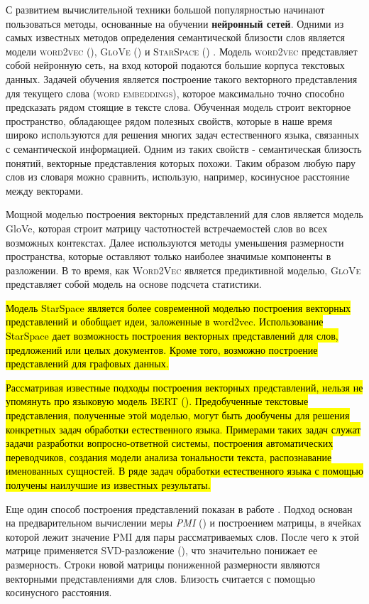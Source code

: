 С развитием вычислительной техники большой популярностью начинают пользоваться методы, основанные на обучении \textbf{нейронный сетей}. Одними из самых известных методов определения семантической близости слов является модели \textsc{word2vec} (\cite{word2vec}), \textsc{GloVe} (\cite{glove}) и \textsc{StarSpace} (\cite{starspace}) . Модель \textsc{word2vec} представляет собой нейронную сеть, на вход которой подаются большие корпуса текстовых данных. Задачей обучения является построение такого векторного представления для текущего слова (\textsc{word embeddings}), которое максимально точно способно предсказать рядом стоящие в тексте слова. Обученная модель строит векторное пространство, обладающее рядом полезных свойств, которые в наше время широко используются для решения многих задач естественного языка, связанных с семантической информацией. Одним из таких свойств - семантическая близость понятий, векторные представления которых похожи. Таким образом любую пару слов из словаря можно сравнить, использую, например, косинусное расстояние между векторами.

Мощной моделью построения векторных представлений для слов является модель GloVe, которая строит матрицу частотностей встречаемостей слов во всех возможных контекстах. Далее используются методы уменьшения размерности пространства, которые оставляют только наиболее значимые компоненты в разложении. В то время, как \textsc{Word2Vec} является предиктивной моделью, \textsc{GloVe} представляет собой модель на основе подсчета статистики.

\hl{Модель StarSpace является более современной моделью построения векторных представлений и обобщает идеи, заложенные в word2vec. Использование StarSpace дает возможность построения векторных представлений для слов, предложений или целых документов. Кроме того, возможно построение представлений для графовых данных.}

\hl{Рассматривая известные подходы построения векторных представлений, нельзя не упомянуть про языковую модель BERT (\cite{bert}). Предобученные текстовые представления, полученные этой моделью, могут быть дообучены для решения конкретных задач обработки естественного языка. Примерами таких задач служат задачи разработки вопросно-ответной системы, построения автоматических переводчиков, создания модели анализа тональности текста, распознавание именованных сущностей. В ряде задач обработки естественного языка с помощью получены наилучшие из известных результаты.}

Еще один способ построения представлений показан в работе \cite{spmi}. Подход основан на предварительном вычислении меры \emph{PMI} (\cite{pmi}) и построением матрицы, в ячейках которой лежит значение PMI для пары рассматриваемых слов. После чего к этой матрице применяется SVD-разложение (\cite{svd}), что значительно понижает ее размерность. Строки новой матрицы пониженной размерности являются векторными представлениями для слов. Близость считается с помощью косинусного расстояния.

